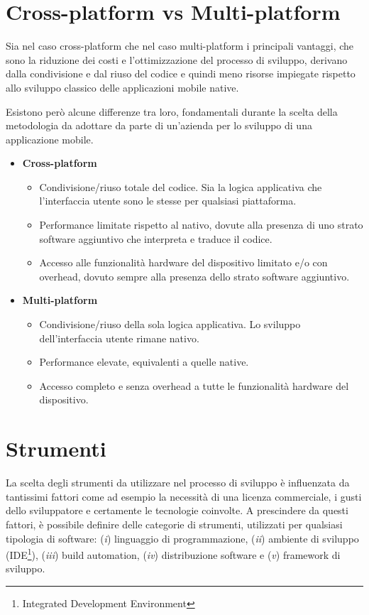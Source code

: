 \section{Cross-platform vs Multi-platform}
Sia nel caso cross-platform che nel caso multi-platform i principali vantaggi,
che sono la riduzione dei costi e l'ottimizzazione del processo di sviluppo, 
derivano dalla condivisione e dal riuso del codice e quindi meno risorse impiegate rispetto allo sviluppo classico delle applicazioni mobile native.

Esistono però alcune differenze tra loro,
fondamentali durante la scelta della metodologia da adottare da parte di un'azienda per lo sviluppo di una applicazione mobile.

\begin{itemize}
    \item \textbf{Cross-platform}
    \begin{itemize}
        \item Condivisione/riuso totale del codice. Sia la logica applicativa che l'interfaccia utente sono le stesse per qualsiasi piattaforma.
        
        \item Performance limitate rispetto al nativo, dovute alla presenza di uno strato software aggiuntivo che interpreta e traduce il codice.
        
        \item Accesso alle funzionalità hardware del dispositivo limitato e/o con overhead, dovuto sempre alla presenza dello strato software aggiuntivo.
    \end{itemize}
    
    \item \textbf{Multi-platform}
    \begin{itemize}
        \item Condivisione/riuso della sola logica applicativa. Lo sviluppo dell'interfaccia utente rimane nativo.
        
        \item Performance elevate, equivalenti a quelle native.
        
        \item Accesso completo e senza overhead a tutte le funzionalità hardware del dispositivo.
    \end{itemize}
\end{itemize}

\section{Strumenti}
\label{app-multiplatform-tools}
La scelta degli strumenti da utilizzare nel processo di sviluppo è influenzata da tantissimi fattori come ad esempio la necessità di una licenza commerciale, 
i gusti dello sviluppatore e certamente le tecnologie coinvolte. 
A prescindere da questi fattori,
è possibile definire delle categorie di strumenti, 
utilizzati per qualsiasi tipologia di software: 
(\textit{i}) linguaggio di programmazione, 
(\textit{ii}) ambiente di sviluppo (IDE\footnote{Integrated Development Environment}), 
(\textit{iii}) build automation, 
(\textit{iv}) distribuzione software e (\textit{v}) framework di sviluppo.

